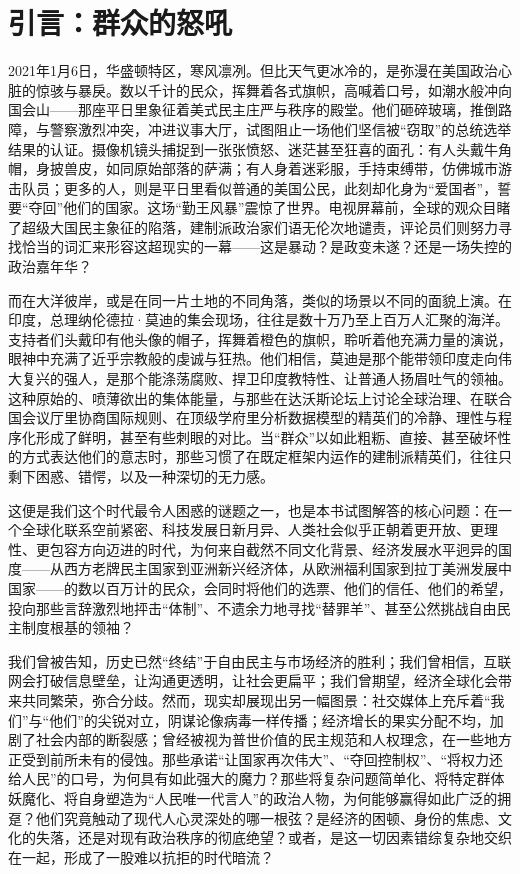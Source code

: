 \chapter{\textbf{引言：群众的怒吼}}

2021年1月6日，华盛顿特区，寒风凛冽。但比天气更冰冷的，是弥漫在美国政治心脏的惊骇与暴戾。数以千计的民众，挥舞着各式旗帜，高喊着口号，如潮水般冲向国会山——那座平日里象征着美式民主庄严与秩序的殿堂。他们砸碎玻璃，推倒路障，与警察激烈冲突，冲进议事大厅，试图阻止一场他们坚信被“窃取”的总统选举结果的认证。摄像机镜头捕捉到一张张愤怒、迷茫甚至狂喜的面孔：有人头戴牛角帽，身披兽皮，如同原始部落的萨满；有人身着迷彩服，手持束缚带，仿佛城市游击队员；更多的人，则是平日里看似普通的美国公民，此刻却化身为“爱国者”，誓要“夺回”他们的国家。这场“勤王风暴”震惊了世界。电视屏幕前，全球的观众目睹了超级大国民主象征的陷落，建制派政治家们语无伦次地谴责，评论员们则努力寻找恰当的词汇来形容这超现实的一幕——这是暴动？是政变未遂？还是一场失控的政治嘉年华？

而在大洋彼岸，或是在同一片土地的不同角落，类似的场景以不同的面貌上演。在印度，总理纳伦德拉·莫迪的集会现场，往往是数十万乃至上百万人汇聚的海洋。支持者们头戴印有他头像的帽子，挥舞着橙色的旗帜，聆听着他充满力量的演说，眼神中充满了近乎宗教般的虔诚与狂热。他们相信，莫迪是那个能带领印度走向伟大复兴的强人，是那个能涤荡腐败、捍卫印度教特性、让普通人扬眉吐气的领袖。这种原始的、喷薄欲出的集体能量，与那些在达沃斯论坛上讨论全球治理、在联合国会议厅里协商国际规则、在顶级学府里分析数据模型的精英们的冷静、理性与程序化形成了鲜明，甚至有些刺眼的对比。当“群众”以如此粗粝、直接、甚至破坏性的方式表达他们的意志时，那些习惯了在既定框架内运作的建制派精英们，往往只剩下困惑、错愕，以及一种深切的无力感。

这便是我们这个时代最令人困惑的谜题之一，也是本书试图解答的核心问题：在一个全球化联系空前紧密、科技发展日新月异、人类社会似乎正朝着更开放、更理性、更包容方向迈进的时代，为何来自截然不同文化背景、经济发展水平迥异的国度——从西方老牌民主国家到亚洲新兴经济体，从欧洲福利国家到拉丁美洲发展中国家——的数以百万计的民众，会同时将他们的选票、他们的信任、他们的希望，投向那些言辞激烈地抨击“体制”、不遗余力地寻找“替罪羊”、甚至公然挑战自由民主制度根基的领袖？

我们曾被告知，历史已然“终结”于自由民主与市场经济的胜利；我们曾相信，互联网会打破信息壁垒，让沟通更透明，让社会更扁平；我们曾期望，经济全球化会带来共同繁荣，弥合分歧。然而，现实却展现出另一幅图景：社交媒体上充斥着“我们”与“他们”的尖锐对立，阴谋论像病毒一样传播；经济增长的果实分配不均，加剧了社会内部的断裂感；曾经被视为普世价值的民主规范和人权理念，在一些地方正受到前所未有的侵蚀。那些承诺“让国家再次伟大”、“夺回控制权”、“将权力还给人民”的口号，为何具有如此强大的魔力？那些将复杂问题简单化、将特定群体妖魔化、将自身塑造为“人民唯一代言人”的政治人物，为何能够赢得如此广泛的拥趸？他们究竟触动了现代人心灵深处的哪一根弦？是经济的困顿、身份的焦虑、文化的失落，还是对现有政治秩序的彻底绝望？或者，是这一切因素错综复杂地交织在一起，形成了一股难以抗拒的时代暗流？

